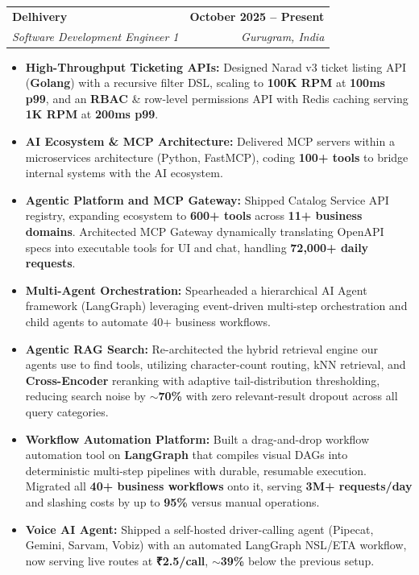 \documentclass[letterpaper,11pt]{article}
\makeatletter
\newcommand{\resumeItem}[1]{\item\small{{#1 \vspace{-2pt}}}}
\newcommand{\resumeSubheading}[4]{
  \vspace{-2pt}\item
  \begin{tabular*}{1.0\textwidth}[t]{l@{\extracolsep{\fill}}r}
    \textbf{#1} & \textbf{\small #2} \\
    \textit{\small#3} & \textit{\small #4} \\
  \end{tabular*}\vspace{-7pt}
}
\newcommand{\resumeItemListStart}{\begin{itemize}}
\newcommand{\resumeItemListEnd}{\end{itemize}\vspace{-5pt}}
\newcommand{\RoleTitle}{Software Development Engineer 1}
\makeatother
\begin{document}
  \resumeSubheading
    {Delhivery}{October 2025 -- Present}
    {\RoleTitle}{Gurugram, India}
    \vspace{-7pt}
    \resumeItemListStart
      \resumeItem{\textbf{High-Throughput Ticketing APIs:} Designed Narad v3 ticket listing API (\textbf{Golang}) with a recursive filter DSL, scaling to \textbf{100K RPM} at \textbf{100ms p99}, and an \textbf{RBAC} \& row-level permissions API with Redis caching serving \textbf{1K RPM} at \textbf{200ms p99}.}
      \resumeItem{\textbf{AI Ecosystem \& MCP Architecture:} Delivered MCP servers within a microservices architecture (Python, FastMCP), coding \textbf{100+ tools} to bridge internal systems with the AI ecosystem.}
      \resumeItem{\textbf{Agentic Platform and MCP Gateway:} Shipped Catalog Service API registry, expanding ecosystem to \textbf{600+ tools} across \textbf{11+ business domains}. Architected MCP Gateway dynamically translating OpenAPI specs into executable tools for UI and chat, handling \textbf{72,000+ daily requests}.}
      \resumeItem{\textbf{Multi-Agent Orchestration:} Spearheaded a hierarchical AI Agent framework (LangGraph) leveraging event-driven multi-step orchestration and child agents to automate 40+ business workflows.}
      \resumeItem{\textbf{Agentic RAG Search:} Re-architected the hybrid retrieval engine our agents use to find tools, utilizing character-count routing, kNN retrieval, and \textbf{Cross-Encoder} reranking with adaptive tail-distribution thresholding, reducing search noise by \textbf{$\sim$70\%} with zero relevant-result dropout across all query categories.}
      \resumeItem{\textbf{Workflow Automation Platform:} Built a drag-and-drop workflow automation tool on \textbf{LangGraph} that compiles visual DAGs into deterministic multi-step pipelines with durable, resumable execution. Migrated all \textbf{40+ business workflows} onto it, serving \textbf{3M+ requests/day} and slashing costs by up to \textbf{95\%} versus manual operations.}
      \resumeItem{\textbf{Voice AI Agent:} Shipped a self-hosted driver-calling agent (Pipecat, Gemini, Sarvam, Vobiz) with an automated LangGraph NSL/ETA workflow, now serving live routes at \textbf{₹2.5/call}, \textbf{$\sim$39\%} below the previous setup.}
    \resumeItemListEnd
\end{document}
